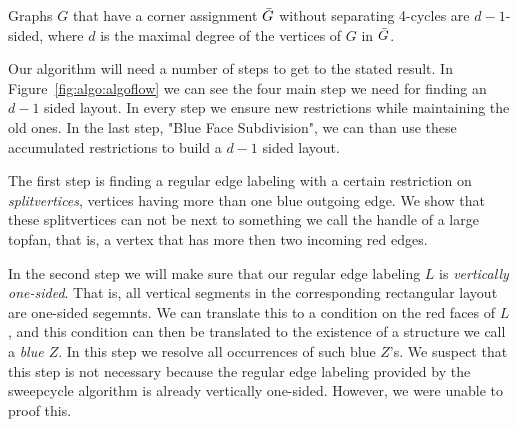   \begin{thrm}
  \label{th:dsided}
  Graphs $G$ that have a corner assignment $\bar{G}$ without separating 4-cycles are $d-1$-sided, where $d$ is the maximal degree of the vertices of $G$ in $\bar{G}$.
  \end{thrm}

  Our algorithm will need a number of steps to get to the stated result. In Figure~\ref{fig:algo:algoflow} we can see the four main step we need for finding an $d-1$ sided layout. In every step we ensure new restrictions while maintaining the old ones. In the last step, "Blue Face Subdivision", we can than use these accumulated restrictions to build a $d-1$ sided layout.

  The first step is finding a regular edge labeling with a certain restriction on \emph{splitvertices}, vertices having more than one blue outgoing edge.
  We show that these splitvertices can not be next to something we call the handle of a large topfan, that is, a vertex that has more then two incoming red edges.

  In the second step we will make sure that our regular edge labeling $L$ is \emph{vertically one-sided}. That is, all vertical segments in the corresponding rectangular layout are one-sided segemnts.
  We can translate this to a condition on the red faces of $L$, and this condition can then be translated to the existence of a structure we call a \emph{blue $Z$}. In this step we resolve all occurrences of such blue $Z$'s.
  We suspect that this step is not necessary because the regular edge labeling provided by the sweepcycle algorithm is already vertically one-sided. However, we were unable to proof this.

